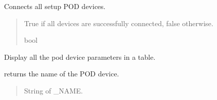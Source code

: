 \documentclass[letterpaper,10pt,english]{sphinxmanual}
\begin{document}
\begin{fulllineitems}
\begin{fulllineitems}
\begin{quote}
\begin{description}
\begin{itemize}
\end{itemize}

\end{description}\end{quote}

\end{fulllineitems}


\begin{fulllineitems}
\label{\detokenize{Setup_PodInterface:Setup_PodInterface.Setup_Interface.ConnectAllPODdevices}}
\pysigstartsignatures
{}
\pysigstopsignatures
\sphinxAtStartPar
Connects all setup POD devices.
\begin{quote}\begin{description}
\sphinxAtStartPar
True if all devices are successfully connected, false otherwise.

\sphinxAtStartPar
bool

\end{description}\end{quote}

\end{fulllineitems}


\begin{fulllineitems}
\label{\detokenize{Setup_PodInterface:Setup_PodInterface.Setup_Interface.DisplayPODdeviceParameters}}
\pysigstartsignatures
{}
\pysigstopsignatures
\sphinxAtStartPar
Display all the pod device parameters in a table.

\end{fulllineitems}


\begin{fulllineitems}
\label{\detokenize{Setup_PodInterface:Setup_PodInterface.Setup_Interface.GetDeviceName}}
\pysigstartsignatures
{}
\pysigstopsignatures
\sphinxAtStartPar
returns the name of the POD device.
\begin{quote}\begin{description}
\sphinxAtStartPar
String of \_NAME.


\end{description}
\end{quote}
\end{fulllineitems}
\end{fulllineitems}
\end{document}
